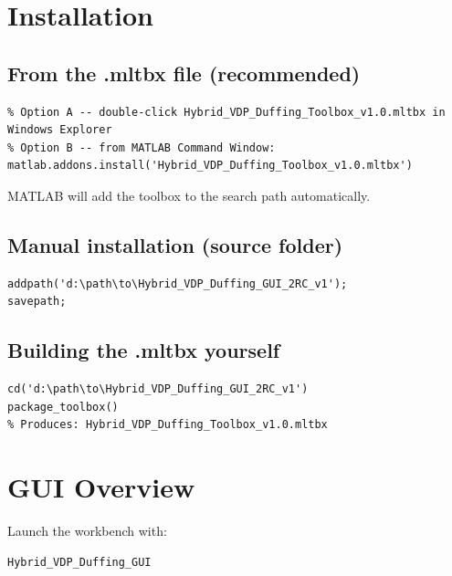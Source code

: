 \documentclass[12pt,a4paper]{article}
\begin{document}
\section{Installation}

\subsection{From the .mltbx file (recommended)}

\begin{lstlisting}
% Option A -- double-click Hybrid_VDP_Duffing_Toolbox_v1.0.mltbx in Windows Explorer
% Option B -- from MATLAB Command Window:
matlab.addons.install('Hybrid_VDP_Duffing_Toolbox_v1.0.mltbx')
\end{lstlisting}

MATLAB will add the toolbox to the search path automatically.

\subsection{Manual installation (source folder)}

\begin{lstlisting}
addpath('d:\path\to\Hybrid_VDP_Duffing_GUI_2RC_v1');
savepath;
\end{lstlisting}

\subsection{Building the .mltbx yourself}

\begin{lstlisting}
cd('d:\path\to\Hybrid_VDP_Duffing_GUI_2RC_v1')
package_toolbox()
% Produces: Hybrid_VDP_Duffing_Toolbox_v1.0.mltbx
\end{lstlisting}

\section{GUI Overview}

Launch the workbench with:

\begin{lstlisting}
Hybrid_VDP_Duffing_GUI
\end{lstlisting}
\end{document}
